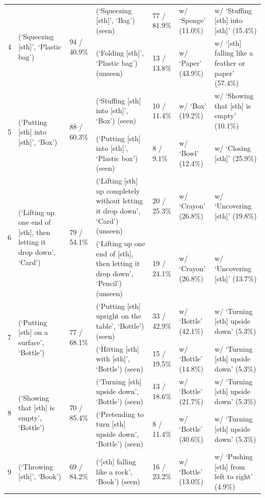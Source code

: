 \begin{table}[t]
{\begin{tabular}{l l l l l l l}
\midrule
\multirow{2}{*}{4} & \multirow{2}{*}{(`Squeezing [sth]', `Plastic bag')} & \multirow{2}{*}{94 / 40.9\%} & (`Squeezing [sth]', `Bag') (seen) & 77 / 81.9\% & w/ `Sponge' (11.0\%) & w/ `Stuffing [sth] into [sth]' (15.4\%) \\
&&& (`Folding [sth]', `Plastic bag') (unseen) & 13 / 13.8\% & w/ `Paper' (43.9\%) & w/ `[sth] falling like a feather or paper' (57.4\%) \\
\midrule
\multirow{2}{*}{5} & \multirow{2}{*}{(`Putting [sth] into [sth]', `Box')} & \multirow{2}{*}{88 / 60.3\%} & (`Stuffing [sth] into [sth]', `Box') (seen) & 10 / 11.4\% & w/ `Box' (19.2\%) & w/ `Showing that [sth] is empty' (10.1\%) \\
&&& (`Putting [sth] into [sth]', `Plastic box') (seen) & 8 / 9.1\% & w/ `Bowl' (12.4\%) & w/ `Closing [sth]' (25.9\%) \\
\midrule
\multirow{2}{*}{6} & \multirow{2}{*}{(`Lifting up one end of [sth], then letting it drop down', `Card')} & \multirow{2}{*}{79 / 54.1\%} & (`Lifting [sth] up completely without letting it drop down', `Card') (unseen) & 20 / 25.3\% & w/ `Crayon' (26.8\%) & w/ `Uncovering [sth]' (19.8\%) \\
&&& (`Lifting up one end of [sth], then letting it drop down', `Pencil') (unseen) & 19 / 24.1\% & w/ `Crayon' (26.8\%) & w/ `Uncovering [sth]' (13.7\%) \\
\midrule
\multirow{2}{*}{7} & \multirow{2}{*}{(`Putting [sth] on a surface', `Bottle')} & \multirow{2}{*}{77 / 68.1\%} & (`Putting [sth] upright on the table', `Bottle') (seen) & 33 / 42.9\% & w/ `Bottle' (42.1\%) & w/ `Turning [sth] upside down' (5.3\%) \\
&&& (`Hitting [sth] with [sth]', `Bottle') (seen) & 15 / 19.5\% & w/ `Bottle' (14.8\%) & w/ `Turning [sth] upside down' (5.3\%) \\
\midrule
\multirow{2}{*}{8} & \multirow{2}{*}{(`Showing that [sth] is empty', `Bottle')} & \multirow{2}{*}{70 / 85.4\%} & (`Turning [sth] upside down', `Bottle') (seen) & 13 / 18.6\% & w/ `Bottle' (21.7\%) & w/ `Turning [sth] upside down' (5.3\%) \\
&&& (`Pretending to turn [sth] upside down', `Bottle') (seen) & 8 / 11.4\% & w/ `Bottle' (30.6\%) & w/ `Turning [sth] upside down' (5.3\%) \\
\midrule
\multirow{2}{*}{9} & \multirow{2}{*}{(`Throwing [sth]', `Book')} & \multirow{2}{*}{69 / 84.2\%} & (`[sth] falling like a rock', `Book') (seen) & 16 / 23.2\% & w/ `Bottle' (13.0\%) & w/ `Pushing [sth] from left to right' (4.9\%) \\

\end{tabular}}
\end{table}
